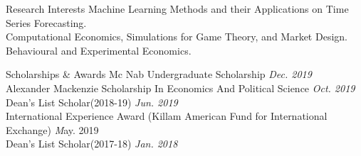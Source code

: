 \documentclass{resume} %
\begin{document}
\begin{rSection}{Research Interests}
Machine Learning Methods and their Applications on Time Series Forecasting.
\\Computational Economics, Simulations for Game Theory, and Market Design.
\\Behavioural and Experimental Economics.
\end{rSection}


\begin{rSection}{Scholarships \& Awards}
{Mc Nab Undergraduate Scholarship} \hfill {\em Dec. 2019} \\
{Alexander Mackenzie Scholarship In Economics And Political Science} \hfill {\em Oct. 2019} \\
{Dean's List Scholar(2018-19)} \hfill {\em Jun. 2019} \\
{International Experience Award (Killam American Fund for International Exchange)} \hfill{\emph May. 2019} \\
{Dean's List Scholar(2017-18)} \hfill {\em Jan. 2018}
\end{rSection}
\end{document}
